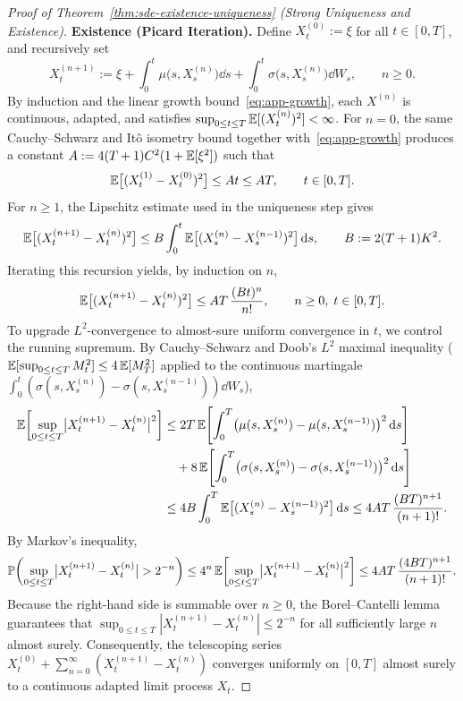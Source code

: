 \begin{proof}[Proof of Theorem~\ref{thm:sde-existence-uniqueness} (Strong Uniqueness and Existence)]
    \textbf{Existence (Picard Iteration).} Define $X_t^{(0)} := \xi$ for all $t \in [0, T]$, and recursively set
    \[
    X_t^{(n+1)} := \xi + \int_0^t \mu\bigl(s, X_s^{(n)}\bigr)\dd s + \int_0^t \sigma\bigl(s, X_s^{(n)}\bigr)\dd W_s, \qquad n \geq 0.
    \]
    By induction and the linear growth bound~\eqref{eq:app-growth}, each $X^{(n)}$ is continuous, adapted, and satisfies $\sup_{0 \leq t \leq T} \mathbb{E}[(X_t^{(n)})^2] < \infty$. For $n = 0$, the same Cauchy--Schwarz and It\^o isometry bound together with~\eqref{eq:app-growth} produces a constant $A := 4(T + 1)C^2(1 + \mathbb{E}[\xi^2])$ such that
    \[
    \mathbb{E}\bigl[(X_t^{(1)} - X_t^{(0)})^2\bigr] \leq A t \leq A T, \qquad t \in [0, T].
    \]
    For $n \geq 1$, the Lipschitz estimate used in the uniqueness step gives
    \[
    \mathbb{E}\bigl[(X_t^{(n+1)} - X_t^{(n)})^2\bigr] \leq B \int_0^t \mathbb{E}\bigl[(X_s^{(n)} - X_s^{(n-1)})^2\bigr]\,\mathrm{d} s, \qquad B := 2(T + 1)K^2.
    \]
    Iterating this recursion yields, by induction on $n$,
    \begin{equation}\label{eq:picard-l2}
        \mathbb{E}\bigl[(X_t^{(n+1)} - X_t^{(n)})^2\bigr] \leq A T\,\frac{(B t)^n}{n!}, \qquad n \geq 0,\; t \in [0, T].
    \end{equation}
    To upgrade $L^2$-convergence to almost-sure uniform convergence in $t$, we control the running supremum. By Cauchy--Schwarz and Doob's $L^2$ maximal inequality ($\mathbb{E}[\sup_{0 \leq t \leq T} M_t^2] \leq 4\,\mathbb{E}[M_T^2]$ applied to the continuous martingale $\int_0^t (\sigma(s, X_s^{(n)}) - \sigma(s, X_s^{(n-1)}))\dd W_s$),
    \begin{align*}
        \mathbb{E}\!\left[\sup_{0 \leq t \leq T} \bigl|X_t^{(n+1)} - X_t^{(n)}\bigr|^2\right]
        &\leq 2T\,\mathbb{E}\!\left[\int_0^T \bigl(\mu(s, X_s^{(n)}) - \mu(s, X_s^{(n-1)})\bigr)^2 \,\mathrm{d} s\right] \\
        &\quad + 8\,\mathbb{E}\!\left[\int_0^T \bigl(\sigma(s, X_s^{(n)}) - \sigma(s, X_s^{(n-1)})\bigr)^2 \,\mathrm{d} s\right] \\
        &\leq 4 B \int_0^T \mathbb{E}\bigl[(X_s^{(n)} - X_s^{(n-1)})^2\bigr]\,\mathrm{d} s
        \leq 4 A T\,\frac{(B T)^{n+1}}{(n + 1)!}.
    \end{align*}
    By Markov's inequality,
    \[
    \mathbb{P}\!\left(\sup_{0 \leq t \leq T} \bigl|X_t^{(n+1)} - X_t^{(n)}\bigr| > 2^{-n}\right)
    \leq 4^n\,\mathbb{E}\!\left[\sup_{0 \leq t \leq T} \bigl|X_t^{(n+1)} - X_t^{(n)}\bigr|^2\right]
    \leq 4 A T\,\frac{(4 B T)^{n+1}}{(n + 1)!}.
    \]
    Because the right-hand side is summable over $n \geq 0$, the Borel--Cantelli lemma guarantees that $\sup_{0 \leq t \leq T} |X_t^{(n+1)} - X_t^{(n)}| \leq 2^{-n}$ for all sufficiently large $n$ almost surely. Consequently, the telescoping series $X_t^{(0)} + \sum_{n=0}^{\infty} (X_t^{(n+1)} - X_t^{(n)})$ converges uniformly on $[0, T]$ almost surely to a continuous adapted limit process $X_t$.


\end{proof}
